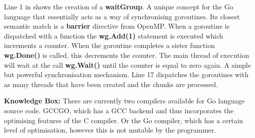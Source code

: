 \documentclass[11pt]{article} %
\begin{document}
Line 1 in shows the creation of a {\bf waitGroup}. A unique concept for the Go language that essentially acts as a way of synchronising goroutines. Its closest semantic match is a {\bf barrier} directive from OpenMP. When a goroutine is dispatched with a function the {\bf wg.Add(1)} statement is executed which increments a counter. When the goroutine completes a sister function {\bf wg.Done()} is called, this decrements the counter. The main thread of execution will wait at the call {\bf wg.Wait()} until the counter is equal to zero again. A simple but powerful synchronisation mechanism. Line 17 dispatches the goroutines with as many threads that have been created and the chunks are processed.
\smallskip
\begin{mdframed}
{\bf Knowledge Box:} There are currently two compilers available for Go language source code. GCCGO, which has a GCC backend and thus incorporates the optimising features of the C compiler. Or the Go compiler, which has a certain level of optimisation, however this is not mutable by the programmer.
\end{mdframed}
\end{document}
